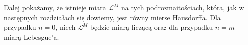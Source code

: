 Dalej pokażamy, że istnieje miara $\mathcal{L}^M$ na tych podrozmaitościach, która, jak w następnych rozdziałach się dowiemy, jest równy mierze Hausdorffa.
Dla przypadku $n=0$, niech $\mathcal{L}^M$ będzie miarą liczącą oraz dla przypadku $n=m$ - miarą Lebesgue'a.